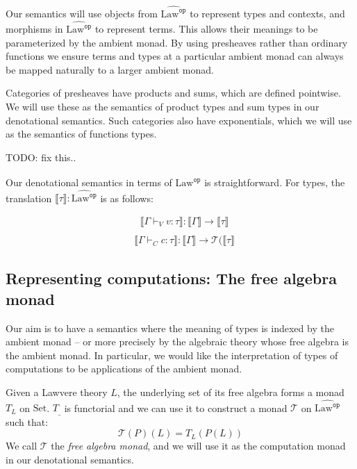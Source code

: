 \documentclass[acmsmall, screen, nonacm]{acmart}
\theoremstyle{definition}
\newcommand{\setc}{\mathrm{Set}}
\newcommand{\lawc}{\mathrm{Law}}
\newcommand{\lawcop}{\lawc^{\mathtt{op}}}
\newcommand{\pshlawcop}{\widehat{\lawcop}}
\newcommand{\sem}[1]{\llbracket #1 \rrbracket}
\newcommand{\mon}{\mathcal{T}}
\newcommand{\types}{\mathrel{:}}
\newcommand{\turnv}{\mathrel{\vdash_V}}
\newcommand{\turnc}{\mathrel{\vdash_C}}
\newcommand{\todo}[1]{{\color{red}TODO: #1}}
\begin{document}
Our semantics will use objects from $\pshlawcop$ to represent types and
contexts, and morphisms in $\pshlawcop$ to represent terms. This allows
their meanings to be parameterized by the ambient monad. By using
presheaves rather than ordinary functions we ensure terms and types at a
particular ambient monad can always be mapped naturally to a larger
ambient monad.

Categories of presheaves have products and sums, which are defined
pointwise. We will use these as the semantics of product types and sum
types in our denotational semantics. Such categories also have
exponentials, which we will use as the semantics of functions types.

\todo{fix this..}

Our denotational semantics in terms of $\pshlawcop$ is
straightforward. For types, the translation
$\sem{\tau} \mathrel{:} \pshlawcop$ is as follows:
\begin{mathpar}

\end{mathpar}

\begin{align*}
&\sem{\Gamma \turnv v \types \tau} \mathrel{:} \sem{\Gamma} \rightarrow \sem{\tau} \\
\end{align*}
\begin{align*}
&\sem{\Gamma \turnc c \types \tau} \mathrel{:} \sem{\Gamma} \rightarrow \mon(\sem{\tau}\end{align*}

\subsection{Representing computations: The free algebra monad}

Our aim is to have a semantics where the meaning of types is indexed by
the ambient monad -- or more precisely by the algebraic theory whose
free algebra is the ambient monad. In particular, we would like the
interpretation of types of computations to be applications of the
ambient monad.

Given a Lawvere theory $L$, the underlying set of its free algebra forms
a monad $T_L$ on $\setc$.  $T_{\_}$ is functorial and we can use it to
construct a monad $\mon$ on $\pshlawcop$ such that:
\begin{equation*}
\mon(P)(L) = T_L(P(L))
\end{equation*}
We call $\mon$ the \emph{free algebra monad}, and we will use it as the
computation monad in our denotational semantics.
\end{document}
